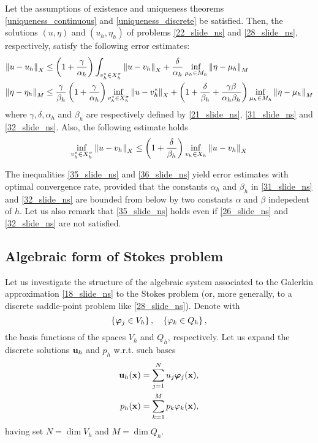 \begin{theorem}
    Let the assumptions of existence and uniqueness theorems \eqref{uniqueness_continuous} and \eqref{uniqueness_discrete} be satisfied. Then, the solutions \((u,\eta)\) and \((u_h, \eta_h)\) of problems \eqref{22_slide_ns} and \eqref{28_slide_ns}, respectively, satisfy the following error estimates: 
    \begin{align}
        \norm{u-u_h}_X &\leq \left( 1+\frac{\gamma}{\alpha_h} \right)\int_{v_h^* \in X_h^\sigma} \norm{u-v_h}_X + \frac{\delta}{\alpha_h} \inf_{\mu_h \in M_h} \norm{\eta - \mu_h}_M \label{35_slide_ns} \\
            \norm{\eta - \eta_h}_M &\leq \frac{\gamma}{\beta_h} \left( 1+\frac{\gamma}{\alpha_h} \right) \inf_{v^*_h \in X_h^\sigma} \norm{u - v^*_h}_X + \left( 1 + \frac{\delta}{\beta_h} + \frac{\gamma \beta}{\alpha_h \beta_h} \right) \inf_{\mu_h \in M_h} \norm{\eta - \mu_h}_M \label{36_slide_ns}
    \end{align}
    where \(\gamma, \delta, \alpha_h\) and \(\beta_h\) are respectively defined by \eqref{21_slide_ns}, \eqref{31_slide_ns} and \eqref{32_slide_ns}. Also, the following estimate holds
    \begin{equation}
        \inf_{v^*_h \in X_h^\sigma} \norm{u - v_h}_X \leq \left( 1 + \frac{\delta}{\beta_h} \right) \inf_{v_h \in X_h} \norm{u - v_h}_X 
        \label{37_slide_ns}
    \end{equation}
\end{theorem}
The inequalities \eqref{35_slide_ns} and \eqref{36_slide_ns} yield error estimates with optimal convergence rate, provided that the constants \(\alpha_h\) and \(\beta_h\) in \eqref{31_slide_ns} and \eqref{32_slide_ns} are bounded from below by two constants \(\alpha\) and \(\beta\) indepedent of \(h\). Let us also remark that \eqref{35_slide_ns} holds even if \eqref{26_slide_ns} and \eqref{32_slide_ns} are not satisfied. 
\subsection*{Algebraic form of Stokes problem}
Let us investigate the structure of the algebraic system associated to the Galerkin approximation \eqref{18_slide_ns} to the Stokes problem (or, more generally, to a discrete saddle-point problem like \eqref{28_slide_ns}). Denote with 
\[
    \left\{ \bm{\phi}_j \in V_h \right\}, \quad \left\{ \oldphi_k \in Q_h \right\},
\]
the basis functions of the spaces \(V_h\) and \(Q_h\), respectively. Let us expand the discrete solutions \(\textbf{u}_h\) and \(p_h\) w.r.t. such bases 
\begin{equation}
    \begin{aligned}
        \uvec_h(\xvec) &= \sum_{j=1}^{N} u_j\bm{\phi}_j(\xvec), \\
        p_h(\xvec) &= \sum_{k=1}^{M} p_k\oldphi_k(\xvec),
        \label{46_slide_ns}
    \end{aligned}
\end{equation}
having set \(N = \dim V_h\) and \(M = \dim Q_h\).

